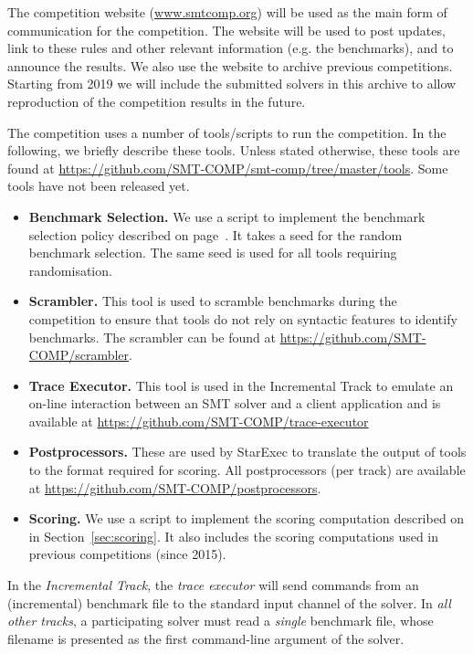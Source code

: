 \documentclass[12pt]{article}
\newcommand{\inctrack}{Incremental Track\xspace}
\begin{document}
The competition website (\url{www.smtcomp.org}) will be used as the main form
of communication for the competition. The website will be used to post updates,
link to these rules and other relevant information (e.g. the benchmarks), and
to announce the results. We also use the website to archive previous
competitions. Starting from 2019 we will include the submitted solvers in this
archive to allow reproduction of the competition results in the future.
%

The competition uses a number of tools/scripts to run the competition. In the
following, we briefly describe these tools. Unless stated otherwise, these
tools are found at \url{https://github.com/SMT-COMP/smt-comp/tree/master/tools}.
{\color{red} Some tools have not been released yet.}
\begin{itemize}
  \item \textbf{Benchmark Selection.} We use a script to implement the
    benchmark selection policy described on page~\pageref{benchmark-selection}.
    It takes a seed for the random benchmark selection. The same seed is used
    for all tools requiring randomisation.
  \item \textbf{Scrambler.} This tool is used to scramble benchmarks during the
    competition to ensure that tools do not rely on syntactic features to
    identify benchmarks. The scrambler can be found at
    \url{https://github.com/SMT-COMP/scrambler}.
  \item \textbf{Trace Executor.} This tool is used in the \inctrack to emulate
    an on-line interaction between an SMT solver and a client application and
    is available at \url{https://github.com/SMT-COMP/trace-executor}
  \item \textbf{Postprocessors.} These are used by StarExec to translate the
    output of tools to the format required for scoring. All postprocessors (per
    track) are available at \url{https://github.com/SMT-COMP/postprocessors}.
  \item \textbf{Scoring.} We use a script to implement the scoring computation
    described on in Section~\ref{sec:scoring}. It also includes the scoring
    computations used in previous competitions (since 2015).
\end{itemize}

%
In the \emph{\inctrack}, the \emph{trace executor} will send commands from an
(incremental) benchmark file to the standard input channel of the solver.  In
\emph{all other tracks}, a participating solver must read a \emph{single}
benchmark file, whose filename is presented as the first command-line argument
of the solver.
\end{document}
